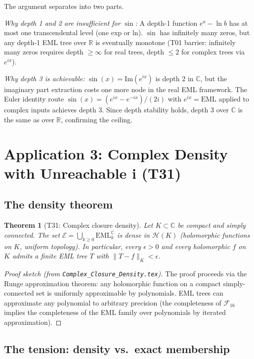 \documentclass[11pt]{article}
\newtheorem{theorem}{Theorem}[section]
\begin{document}
The argument separates into two parts.

\emph{Why depth 1 and 2 are insufficient for $\sin$:}
A depth-1 function $e^a - \ln b$ has at most one transcendental level (one exp or ln).
$\sin$ has infinitely many zeros, but any depth-1 EML tree over $\mathbb{R}$ is
eventually monotone (T01 barrier: infinitely many zeros requires depth $\geq \infty$
for real trees, depth $\leq 2$ for complex trees via $e^{ix}$).

\emph{Why depth 3 is achievable:}
$\sin(x) = \mathrm{Im}(e^{ix})$ is depth 2 in $\mathbb{C}$, but the imaginary part
extraction costs one more node in the real EML framework.
The Euler identity route $\sin(x) = (e^{ix} - e^{-ix})/(2i)$ with
$e^{ix} = \mathrm{EML}$ applied to complex inputs achieves depth 3.
Since depth stability holds, depth 3 over $\mathbb{C}$ is the same as over $\mathbb{R}$,
confirming the ceiling.

\section{Application 3: Complex Density with Unreachable i (T31)}

\subsection{The density theorem}

\begin{theorem}[T31: Complex closure density]
\label{thm:density}
Let $K \subset \mathbb{C}$ be compact and simply connected.
The set $\mathcal{E} = \bigcup_{k \geq 0} \mathrm{EML}_k^{\mathbb{C}}$ is dense in
$\mathcal{H}(K)$ (holomorphic functions on $K$, uniform topology).
In particular, every $\epsilon > 0$ and every holomorphic $f$ on $K$ admits
a finite EML tree $T$ with $\|T - f\|_K < \epsilon$.
\end{theorem}

\begin{proof}[Proof sketch (from \texttt{Complex\_Closure\_Density.tex})]
The proof proceeds via the Runge approximation theorem: any holomorphic function
on a compact simply-connected set is uniformly approximable by polynomials.
EML trees can approximate any polynomial to arbitrary precision
(the completeness of $\mathcal{F}_{16}$ implies the completeness of the EML family
over polynomials by iterated approximation).
\end{proof}

\subsection{The tension: density vs.\ exact membership}
\end{document}
